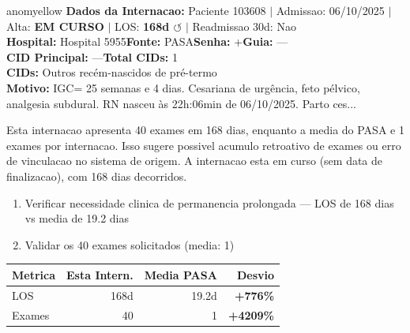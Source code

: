 \documentclass[a4paper,10pt]{article}
\begin{document}
\begin{anomalycard}[Internacao 171028 | PASA | MODERADO (z=2.28)]{anomyellow}
\textbf{Dados da Internacao:} Paciente 103608 $\mid$ Admissao: 06/10/2025 $\mid$ Alta: \textcolor{anomorange}{\textbf{EM CURSO}} $\mid$ LOS: \textbf{168d \textcolor{anomorange}{$\circlearrowleft$}} $\mid$ Readmissao 30d: Nao\\
\textbf{Hospital:} Hospital 5955\quad\textbf{Fonte:} PASA\quad\textbf{Senha:} +\quad\textbf{Guia:} ---\\
\textbf{CID Principal:} {\small ---}\quad\textbf{Total CIDs:} 1\\

\textbf{CIDs:} {\scriptsize Outros recém-nascidos de pré-termo}\\

\textbf{Motivo:} {\scriptsize IGC= 25 semanas e 4 dias. Cesariana de urgência, feto pélvico, analgesia subdural. RN nasceu às 22h:06min de 06/10/2025. Parto ces...}\\

\vspace{2pt}\begin{tcolorbox}[colback=severityred!20,colframe=anomyellow,title={\textbf{Interpretacao de Negocio}},fonttitle=\bfseries\small,left=4pt,right=4pt,top=3pt,bottom=3pt]
{\small Esta internacao apresenta 40 exames em 168 dias, enquanto a media do PASA e 1 exames por internacao. Isso sugere possivel acumulo retroativo de exames ou erro de vinculacao no sistema de origem. A internacao esta em curso (sem data de finalizacao), com 168 dias decorridos.}
\end{tcolorbox}
\begin{tcolorbox}[colback=severityyellow!30,colframe=anomorange,title={\textbf{Recomendacoes Especificas}},fonttitle=\bfseries\small,left=4pt,right=4pt,top=3pt,bottom=3pt]
\begin{enumerate}[nosep,leftmargin=16pt]
\item {\small Verificar necessidade clinica de permanencia prolongada --- LOS de 168 dias vs media de 19.2 dias}
\item {\small Validar os 40 exames solicitados (media: 1)}
\end{enumerate}
\end{tcolorbox}
\begin{center}\begin{tabular}{l r r r}\toprule\textbf{Metrica} & \textbf{Esta Intern.} & \textbf{Media PASA} & \textbf{Desvio} \\\midrule
LOS & 168d & 19.2d & \textcolor{anomred}{\textbf{+776\%}} \\
Exames & 40 & 1 & \textcolor{anomred}{\textbf{+4209\%}} \\
\bottomrule\end{tabular}\end{center}


\end{anomalycard}
\end{document}

